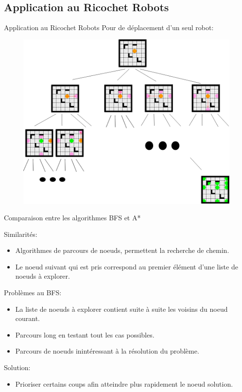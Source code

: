 \documentclass{beamer}
\begin{document}
    \subsection{Application au Ricochet Robots}
        \begin{frame}{Application au Ricochet Robots}
            Pour de déplacement d'un seul robot:
            \begin{figure}
                \centering
                \includegraphics[scale=0.25]{images/bfsRicochet.png}
            \end{figure}
        \end{frame}
        \begin{frame}{Comparaison entre les algorithmes BFS et A*}
            
                Similarités:
                \begin{itemize}
                    \item Algorithmes de parcours de noeuds, permettent la recherche de chemin.
                    \item Le noeud suivant qui est pris correspond au premier élément d'une liste de noeuds à explorer.
                \end{itemize}
                
                Problèmes au BFS:
                \begin{itemize}
                    \item La liste de noeuds à explorer contient suite à suite les voisins du noeud courant.
                    \item Parcours long en testant tout les cas possibles.
                    \item Parcours de noeuds inintéressant à la résolution du problème.
                \end{itemize}
                
                Solution:
                \begin{itemize}
                    \item Prioriser certains coups afin atteindre plus rapidement le noeud solution.
                \end{itemize}
        \end{frame}
\end{document}
